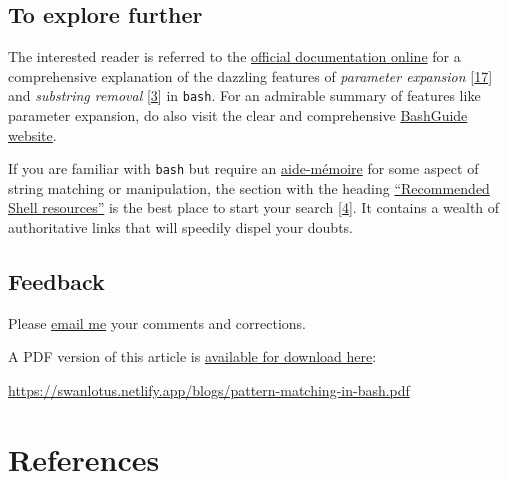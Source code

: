 \documentclass[
  a4paper,
]{article}
\begin{document}
\hypertarget{to-explore-further}{%
\subsection{To explore further}\label{to-explore-further}}

The interested reader is referred to the
\href{https://www.gnu.org/savannah-checkouts/gnu/bash/manual/bash.html\#Shell-Parameter-Expansion}{official
documentation online} for a comprehensive explanation of the dazzling
features of \emph{parameter expansion}
{[}\protect\hyperlink{ref-shellparamexp}{17}{]} and \emph{substring
removal} {[}\protect\hyperlink{ref-wikisubstring}{3}{]} in
\texttt{bash}. For an admirable summary of features like parameter
expansion, do also visit the clear and comprehensive
\href{https://mywiki.wooledge.org/BashGuide/Parameters}{BashGuide
website}.

If you are familiar with \texttt{bash} but require an
\href{https://www.thefreedictionary.com/aide+memoire}{aide-mémoire} for
some aspect of string matching or manipulation, the section with the
heading
\href{https://wiki.bash-hackers.org/start\#recommended_shell_resources}{``Recommended
Shell resources''} is the best place to start your search
{[}\protect\hyperlink{ref-bhwstart}{4}{]}. It contains a wealth of
authoritative links that will speedily dispel your doubts.

\hypertarget{feedback}{%
\subsection{Feedback}\label{feedback}}

Please \href{mailto:feedback.swanlotus@gmail.com}{email me} your
comments and corrections.

\noindent A PDF version of this article is
\href{./pattern-matching-in-bash.pdf}{available for download here}:

\begin{ttfamily}

\begin{small}

\url{https://swanlotus.netlify.app/blogs/pattern-matching-in-bash.pdf}

\end{small}

\end{ttfamily}

\hypertarget{bibliography}{%
\section*{References}\label{bibliography}}
\end{document}
